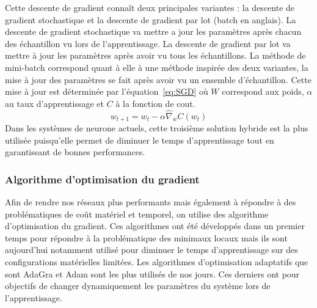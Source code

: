 Cette descente de gradient connaît deux principales variantes : la descente de gradient stochastique et la descente de gradient par lot (batch en anglais). La descente de gradient stochastique va mettre a jour les paramètres après chacun des échantillon vu lors de l'apprentissage. La descente de gradient par lot va mettre à jour les paramètres après avoir vu tous les échantillons. La méthode de mini-batch correspond quant à elle à une méthode inspirée des deux variantes, la mise à jour des paramètres se fait après avoir vu un ensemble d'échantillon. Cette mise à jour est déterminée par l'équation~\ref{eq:SGD} où $W$ correspond aux poids, $\alpha$ au taux d'apprentissage et $C$ à la fonction de cout.
\begin{equation}
  w_{t+1} = w_{t} - \alpha\hat{\nabla}_{w}{C(w_{t})}
  \label{eq:SGD}
\end{equation}
Dans les systèmes de neurone actuels, cette troisième solution hybride est la plus utilisée puisqu'elle permet de diminuer le temps d'apprentissage tout en garantissant de bonnes performances.


\subsubsection{Algorithme d'optimisation du gradient}
Afin de rendre nos réseaux plus performants mais également à répondre à des problématiques de coût matériel et temporel, on utilise des algorithme d'optimisation du gradient. Ces algorithmes ont été développés dans un premier temps pour répondre à la problématique des minimaux locaux mais ils sont  aujourd'hui notamment utilisé pour diminuer le temps d'apprentissage sur des configurations matérielles limitées.
Les algorithmes d'optimisation adaptatifs que sont AdaGra et Adam sont les plus utilisés de nos jours. Ces derniers ont pour objectifs de changer dynamiquement les paramètres du système lors de l'apprentissage.

